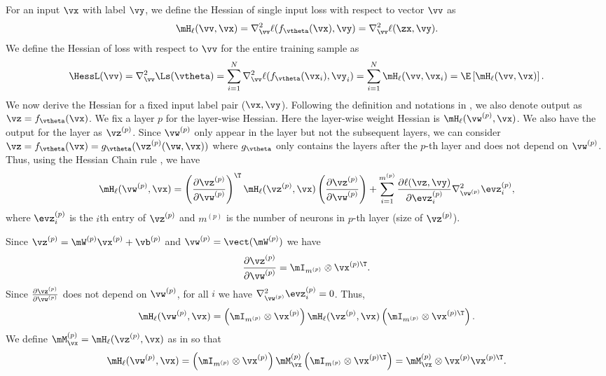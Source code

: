 \label{sec:appendix_derivation}
For an input $\vx$ with label $\vy$, we define the Hessian of single input loss with respect to vector $\vv$ as
\begin{equation}
    \mH_\ell(\vv, \vx) = \nabla^2_\vv \ell(f_\vtheta(\vx), \vy) = \nabla^2_\vv \ell(\zx, \vy).
\end{equation}
We define the Hessian of loss with respect to $\vv$ for the entire training sample as
\begin{equation}
   \HessL(\vv) = \nabla^2_\vv\Ls(\vtheta) = \sum_{i=1}^N \nabla^2_\vv \ell(f_\vtheta(\vx_i), \vy_i)= \sum_{i=1}^N \mH_\ell(\vv, \vx_i) = \E\left[ \mH_\ell(\vv, \vx)\right].
\end{equation}
We now derive the Hessian for a fixed input label pair ($\vx, \vy$). Following the definition and notations in , we also denote output as $\vz = f_\vtheta(\vx)$. We fix a layer $p$ for the layer-wise Hessian. Here the layer-wise weight Hessian is $\mH_\ell(\vw^{(p)}, \vx)$. We also have the output for the layer as $\vz^{(p)}$. Since $\vw^{(p)}$ only appear in the layer but not the subsequent layers, we can consider $ \vz = f_\vtheta(\vx) = g_\vtheta(\vz^{(p)}(\vw,\vx))$ where $g_\vtheta$ only contains the layers after the $p$-th layer and does not depend on $\vw^{(p)}$. Thus, using the Hessian Chain rule \citep{skorski2019chain}, we have 
\begin{equation}
    \mH_\ell(\vw^{(p)}, \vx) = \left(\frac{\partial \vz^{(p)}}{\partial\vw^{(p)}}\right)^\T\mH_\ell(\vz^{(p)}, \vx)\left(\frac{\partial \vz^{(p)}}{\partial\vw^{(p)}}\right) + \sum_{i=1}^{m^{(p)}} \frac{\partial \ell(\vz, \vy)}{\partial\evz_i^{(p)}} \nabla^2_{\vw^{(p)}} \evz_i^{(p)},
\end{equation}
where $\evz_i^{(p)}$ is the $i$th entry of $\vz^{(p)}$ and $m^{(p)}$ is the number of neurons in $p$-th layer (size of $\vz^{(p)}$).

Since $\vz^{(p)} = \mW^{(p)}\vx^{(p)} + \vb^{(p)}$ and $\vw^{(p)} = \vect(\mW^{(p)})$ we have
\begin{equation}
    \frac{\partial \vz^{(p)}}{\partial\vw^{(p)}} = \mI_{m^{(p)}} \otimes \vx^{(p)\T}.
\end{equation}
Since $\frac{\partial \vz^{(p)}}{\partial\vw^{(p)}}$ does not depend on $\vw^{(p)}$, for all $i$ we have $\nabla^2_{\vw^{(p)}} \evz_i^{(p)} = 0$.
Thus, \begin{equation}
    \mH_\ell(\vw^{(p)}, \vx) = \left(\mI_{m^{(p)}} \otimes \vx^{(p)}\right)\mH_\ell(\vz^{(p)}, \vx)\left(\mI_{m^{(p)}} \otimes \vx^{(p)\T}\right).
\end{equation}
We define $\mM^{(p)}_\vx = \mH_\ell(\vz^{(p)}, \vx)$ as in  so that \begin{equation}
    \mH_\ell(\vw^{(p)}, \vx) = \left(\mI_{m^{(p)}} \otimes \vx^{(p)}\right)\mM^{(p)}_\vx\left(\mI_{m^{(p)}} \otimes \vx^{(p)\T}\right) = \mM_\vx^{(p)} \otimes \vx^{(p)}\vx^{(p)\T}.
    \label{eqn:appendix_closeformhessian}
\end{equation}


